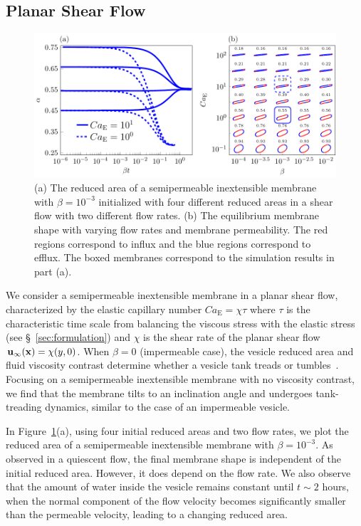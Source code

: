 \documentclass[prb,preprint,showpacs,preprintnumbers,amsmath,amssymb,longbibliography]{revtex4-1}
\newif\ifTikz
\begin{document}
\subsection{Planar Shear Flow}
\begin{figure}[htp]
  \centering
  \ifTikz
  
  \else
  \includegraphics{figures/shearComposite.pdf}
  \fi
  \caption{\label{fig:shearComposite} (a) The reduced area of a
  semipermeable inextensible membrane with $\beta = 10^{-3}$ initialized
  with four different reduced areas in a shear flow with two different
  flow rates. (b) The equilibrium membrane shape with varying flow rates
  and membrane permeability. The red regions correspond to influx and
  the blue regions correspond to efflux. The boxed membranes correspond
  to the simulation results in part (a).}
\end{figure}

We consider a semipermeable inextensible membrane in a planar shear
flow, characterized by the elastic capillary number
$Ca_\mathrm{E}=\chi\tau$ where $\tau$ is the characteristic time scale
from balancing the viscous stress with the elastic stress
(see \S~\ref{sec:formulation}) and $\chi$ is the shear rate of the
planar shear flow $\mathbf{u}_{\infty}(\mathbf{x}) = \chi (y,0)$. When $\beta=0$
(impermeable case), the vesicle reduced area and fluid viscosity
contrast determine whether a vesicle tank treads or
tumbles~\cite{fin-lam-sei-gom2008, kra-win-sei-lip1996}. Focusing on a
semipermeable inextensible membrane with no viscosity contrast, we find
that the membrane tilts to an inclination angle and undergoes
tank-treading dynamics, similar to the case of an impermeable vesicle.

In Figure~\ref{fig:shearComposite}(a), using four initial reduced areas
and two flow rates, we plot the reduced area of a semipermeable inextensible membrane
with $\beta = 10^{-3}$. As observed in a quiescent flow, the final
membrane shape is independent of the initial reduced area. However, it
does depend on the flow rate. We also observe that the amount of water
inside the vesicle remains constant until $t\sim 2$ hours, when the
normal component of the flow velocity becomes significantly smaller than
the permeable velocity, leading to a changing reduced area.
\end{document}

